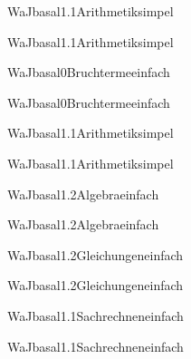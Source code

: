 \documentclass[12pt]{article}
\begin{document}
\begin{Add}{WaJ}{basal1.1}{Arithmetik}{simpel}
\solution{ }
\end{Add}
\begin{Add}{WaJ}{basal1.1}{Arithmetik}{simpel}
\end{Add}

\begin{Add}{WaJ}{basal0}{Bruchterme}{einfach}
\solution{ }
\end{Add}
\begin{Add}{WaJ}{basal0}{Bruchterme}{einfach}
\end{Add}

\begin{Add}{WaJ}{basal1.1}{Arithmetik}{simpel}
\solution{ }
\end{Add}
\begin{Add}{WaJ}{basal1.1}{Arithmetik}{simpel}
\end{Add}

\begin{Add}{WaJ}{basal1.2}{Algebra}{einfach}
\solution{ }
\end{Add}
\begin{Add}{WaJ}{basal1.2}{Algebra}{einfach}
\end{Add}

    \begin{Add}{WaJ}{basal1.2}{Gleichungen}{einfach}
    \solution{ }
    \end{Add}
    \begin{Add}{WaJ}{basal1.2}{Gleichungen}{einfach}
    \end{Add}
    

\begin{Add}{WaJ}{basal1.1}{Sachrechnen}{einfach}
\solution{ }
\end{Add}
\begin{Add}{WaJ}{basal1.1}{Sachrechnen}{einfach}
\end{Add}
\end{document}
